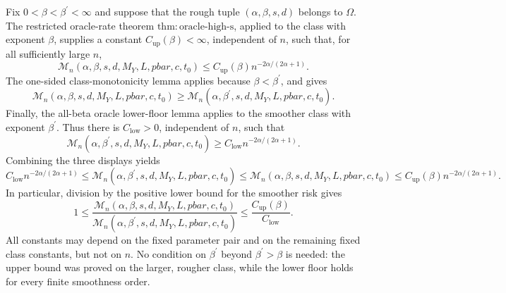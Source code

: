 Fix \(0<\beta<\beta^{\prime}<\infty\) and suppose that the rough tuple \((\alpha,\beta,s,d)\) belongs to \(\Omega\). The restricted oracle-rate theorem \(\mathrm{thm:oracle\text{-}high\text{-}s}\), applied to the class with exponent \(\beta\), supplies a constant \(C_{\mathrm{up}}(\beta)<\infty\), independent of \(n\), such that, for all sufficiently large \(n\),
\[
\mathcal M_n(\alpha,\beta,s,d,M_Y,L,pbar,c,t_0)
\le C_{\mathrm{up}}(\beta)n^{-2\alpha/(2\alpha+1)}.
\]
The one-sided class-monotonicity lemma applies because \(\beta<\beta^{\prime}\), and gives
\[
\mathcal M_n(\alpha,\beta,s,d,M_Y,L,pbar,c,t_0)
\ge
\mathcal M_n(\alpha,\beta^{\prime},s,d,M_Y,L,pbar,c,t_0).
\]
Finally, the all-beta oracle lower-floor lemma applies to the smoother class with exponent \(\beta^{\prime}\). Thus there is \(C_{\mathrm{low}}>0\), independent of \(n\), such that
\[
\mathcal M_n(\alpha,\beta^{\prime},s,d,M_Y,L,pbar,c,t_0)
\ge C_{\mathrm{low}}n^{-2\alpha/(2\alpha+1)}.
\]
Combining the three displays yields
\[
C_{\mathrm{low}}n^{-2\alpha/(2\alpha+1)}
\le \mathcal M_n(\alpha,\beta^{\prime},s,d,M_Y,L,pbar,c,t_0)
\le \mathcal M_n(\alpha,\beta,s,d,M_Y,L,pbar,c,t_0)
\le C_{\mathrm{up}}(\beta)n^{-2\alpha/(2\alpha+1)}.
\]
In particular, division by the positive lower bound for the smoother risk gives
\[
1\le
\frac{\mathcal M_n(\alpha,\beta,s,d,M_Y,L,pbar,c,t_0)}
{\mathcal M_n(\alpha,\beta^{\prime},s,d,M_Y,L,pbar,c,t_0)}
\le \frac{C_{\mathrm{up}}(\beta)}{C_{\mathrm{low}}}.
\]
All constants may depend on the fixed parameter pair and on the remaining fixed class constants, but not on \(n\). No condition on \(\beta^{\prime}\) beyond \(\beta^{\prime}>\beta\) is needed: the upper bound was proved on the larger, rougher class, while the lower floor holds for every finite smoothness order.